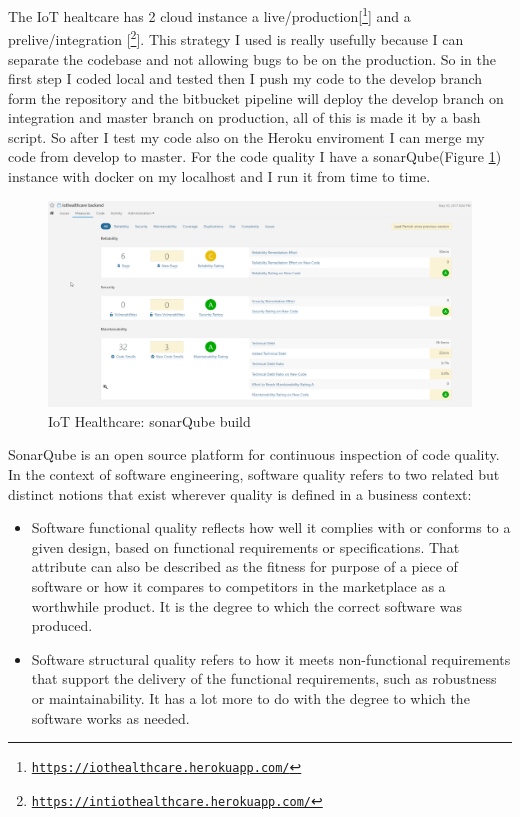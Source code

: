 The IoT healtcare has 2 cloud instance a live/production[\footnote{\href{https://iothealthcare.herokuapp.com/}{\texttt{https://iothealthcare.herokuapp.com/}}}] and a prelive/integration [\footnote{\href{https://intiothealthcare.herokuapp.com/}{\texttt{https://intiothealthcare.herokuapp.com/}}}]. This strategy I used is really usefully because I can separate the codebase and not allowing bugs to be on the production. So in the first step I coded local and tested then I push my code to the develop branch form the repository and the bitbucket pipeline will deploy the develop branch on integration and master branch on production, all of this is made it by a bash script. So after I test my code also on the Heroku enviroment I can merge my code from develop to master.
For the code quality I have a sonarQube(Figure \ref{fig:sonar}) instance with docker on my localhost and I run it from time to time. 
\newline
\begin{figure}[h]
	\centering
	\includegraphics[width=\linewidth]{images/sonarqube}
	\caption{IoT Healthcare: sonarQube build}
	\label{fig:sonar}
\end{figure}
SonarQube is an open source platform for continuous inspection of code quality.
\newline
In the context of software engineering, software quality refers to two related but distinct notions that exist wherever quality is defined in a business context:
\begin{itemize}
	\item Software functional quality reflects how well it complies with or conforms to a given design, based on functional requirements or specifications. That attribute can also be described as the fitness for purpose of a piece of software or how it compares to competitors in the marketplace as a worthwhile product. It is the degree to which the correct software was produced.
	\item Software structural quality refers to how it meets non-functional requirements that support the delivery of the functional requirements, such as robustness or maintainability. It has a lot more to do with the degree to which the software works as needed.
\end{itemize}
